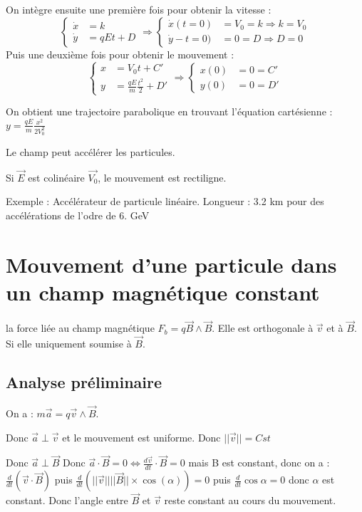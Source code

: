 \documentclass[french]{yLectureNote}
\renewcommand{\vec}{\overrightarrow}
\newcommand{\norm}[1]{||\vec{#1}||}
\begin{document}
On intègre ensuite une première fois pour obtenir la vitesse :
\[
 \left\{\begin{matrix}
 \dot{x} &= k \\
 \dot{y} &=qEt + D
\end{matrix}\right.
\Rightarrow
 \left\{\begin{matrix}
 \dot{x}(t=0) &= V_0 = k \Rightarrow k = V_0 \\
 \dot{y}-t=0) &=0 = D \Rightarrow D = 0
\end{matrix}\right.
\]
Puis une deuxième fois pour obtenir le mouvement :
\[
 \left\{\begin{matrix}
 x &= V_0t + C' \\
 y &= \frac{qE}{m}\frac{t^2}{2} + D'
\end{matrix}\right.
\Rightarrow
\left\{\begin{matrix}
 x(0) &=0 = C' \\
 y(0) &= 0 = D'
\end{matrix}\right.
\]

On obtient une trajectoire parabolique en trouvant l'équation cartésienne : $y = \frac{qE}{m}\frac{x^2}{2V_0^2}$

Le champ peut accélérer les particules.

Si $\vec{E}$ est colinéaire $ \vec{V_0}$, le mouvement est rectiligne.

Exemple : Accélérateur de particule linéaire. Longueur : 3.2 km pour des accélérations de l'odre de 6. GeV
\section{Mouvement d'une particule dans un champ magnétique constant}


la force liée au champ magnétique $F_b = q\vec{B} \wedge \vec{B}$. Elle est orthogonale à $\vec{v}$ et à $\vec{B}$. Si elle uniquement soumise à $\vec{B}$.
\subsection{Analyse préliminaire}
On a : $m\vec{a} = q\vec{v}\wedge \vec{B}$.

Donc $\vec{a} \perp \vec{v}$ et le mouvement est uniforme. Donc $\norm{v} = Cst$

Donc $\vec{a}\perp\vec{B}$ Donc $\vec{a}\cdot \vec{B} = 0 \iff \frac{d \vec{v}}{dt}\cdot \vec{B} = 0$ mais B est constant, donc on a : $\frac{d}{dt} (\vec{v}\cdot\vec{B})$ puis $\frac{d}{dt}(\norm{v}\norm{B}\times\cos(\alpha))  =0$ puis $\frac{d}{dt}\cos\alpha = 0$\marginInfo{Car $\norm{v}$ et $\norm{B}$ sont constants.} donc $\alpha $ est constant. Donc l'angle entre $\vec{B}$ et $\vec{v}$ reste constant au cours du mouvement.
\end{document}
